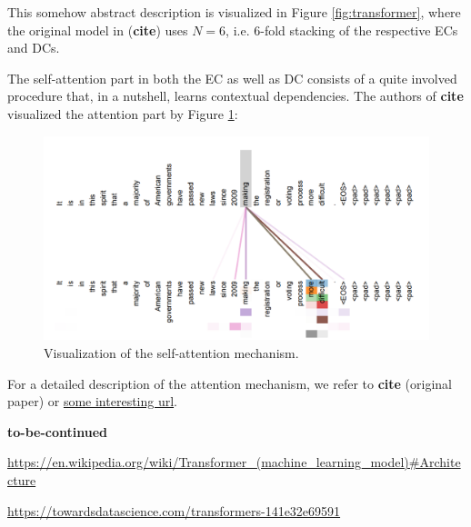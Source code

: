 \documentclass[11pt,a4paper]{article}
\begin{document}
This somehow abstract description is visualized in Figure \ref{fig:transformer}, where the original model in (\textbf{cite}) uses $N=6$, i.e. 6-fold stacking of the respective ECs and DCs.

The self-attention part in both the EC as well as DC consists of a quite involved procedure that, in a nutshell, learns contextual dependencies. The authors of \textbf{cite} visualized the attention part by Figure \ref{fig:attention}:

\begin{figure}[h]
    \centering
    \includegraphics[scale=0.7]{paper/images/attention.PNG}
    \caption{Visualization of the self-attention mechanism.}
    \label{fig:attention}
\end{figure}

For a detailed description of the attention mechanism, we refer to \textbf{cite} (original paper) or \href{some interesting url}{some interesting url}.

\textbf{to-be-continued}
\cite{http://jalammar.github.io/illustrated-transformer/}


\href{https://en.wikipedia.org/wiki/Transformer_(machine_learning_model)#Architecture}{https://en.wikipedia.org/wiki/Transformer_(machine_learning_model)#Architecture}

\href{https://towardsdatascience.com/transformers-141e32e69591}{https://towardsdatascience.com/transformers-141e32e69591}
\end{document}
